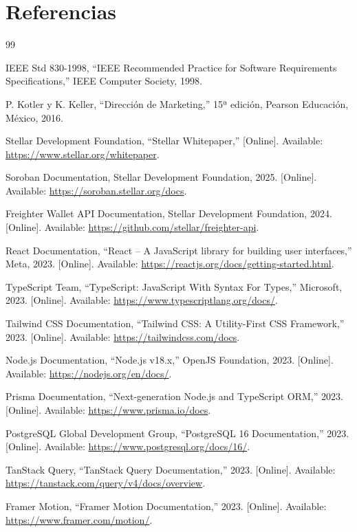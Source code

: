 \documentclass[12pt,letterpaper]{article}
\begin{document}
\section{Referencias}
\begin{thebibliography}{99}

IEEE Std 830-1998, ``IEEE Recommended Practice for Software Requirements Specifications,'' IEEE Computer Society, 1998.

P. Kotler y K. Keller, ``Dirección de Marketing,'' 15ª edición, Pearson Educación, México, 2016.

Stellar Development Foundation, ``Stellar Whitepaper,'' [Online]. Available: \url{https://www.stellar.org/whitepaper}.

Soroban Documentation, Stellar Development Foundation, 2025. [Online]. Available: \url{https://soroban.stellar.org/docs}.

Freighter Wallet API Documentation, Stellar Development Foundation, 2024. [Online]. Available: \url{https://github.com/stellar/freighter-api}.

React Documentation, ``React – A JavaScript library for building user interfaces,'' Meta, 2023. [Online]. Available: \url{https://reactjs.org/docs/getting-started.html}.

TypeScript Team, ``TypeScript: JavaScript With Syntax For Types,'' Microsoft, 2023. [Online]. Available: \url{https://www.typescriptlang.org/docs/}.

Tailwind CSS Documentation, ``Tailwind CSS: A Utility-First CSS Framework,'' 2023. [Online]. Available: \url{https://tailwindcss.com/docs}.

Node.js Documentation, ``Node.js v18.x,'' OpenJS Foundation, 2023. [Online]. Available: \url{https://nodejs.org/en/docs/}.

Prisma Documentation, ``Next-generation Node.js and TypeScript ORM,'' 2023. [Online]. Available: \url{https://www.prisma.io/docs}.

PostgreSQL Global Development Group, ``PostgreSQL 16 Documentation,'' 2023. [Online]. Available: \url{https://www.postgresql.org/docs/16/}.

TanStack Query, ``TanStack Query Documentation,'' 2023. [Online]. Available: \url{https://tanstack.com/query/v4/docs/overview}.

Framer Motion, ``Framer Motion Documentation,'' 2023. [Online]. Available: \url{https://www.framer.com/motion/}.

\end{thebibliography}
\end{document}
